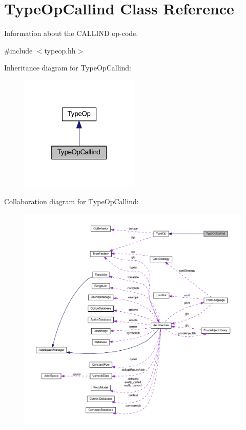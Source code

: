 \hypertarget{class_type_op_callind}{}\section{Type\+Op\+Callind Class Reference}
\label{class_type_op_callind}


Information about the C\+A\+L\+L\+I\+ND op-\/code.  




{\ttfamily \#include $<$typeop.\+hh$>$}



Inheritance diagram for Type\+Op\+Callind\+:
\nopagebreak
\begin{figure}[H]
\begin{center}
\leavevmode
\includegraphics[width=160pt]{class_type_op_callind__inherit__graph}
\end{center}
\end{figure}


Collaboration diagram for Type\+Op\+Callind\+:
\nopagebreak
\begin{figure}[H]
\begin{center}
\leavevmode
\includegraphics[width=350pt]{class_type_op_callind__coll__graph}
\end{center}
\end{figure}

